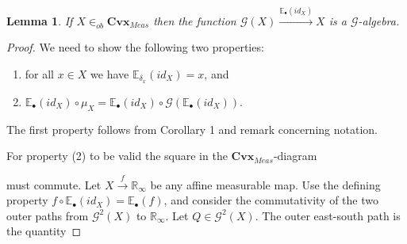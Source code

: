 \documentclass[11pt]{amsart}    %
\newtheorem{lemma}{Lemma}
\newcommand{\Rinf}{\mathbb{R}_{\infty}}
\newcommand{\G}{\mathcal{G}}
\begin{document}
\begin{lemma}
If $X \in_{ob} \mathbf{Cvx}_{Meas}$ then the function $\G(X) \xrightarrow{\mathbb{E}_{\bullet}(id_X)} X$ is a $\G$-algebra.
\end{lemma}
\begin{proof} 
We need to show the following two properties: 
\begin{enumerate}
\item  for all $x \in X$ we have $\mathbb{E}_{\delta_x}(id_X) = x$, and 
\item $ \mathbb{E}_{\bullet}(id_X) \circ \mu_X = \mathbb{E}_{\bullet}(id_X) \circ \G(\mathbb{E}_{\bullet}(id_X))$.
\end{enumerate}
The first property follows from  Corollary 1 and remark concerning notation.  

 For property (2) to be valid the square in the $\mathbf{Cvx}_{Meas}$-diagram
\begin{center}
\end{center}
must commute.  Let $X \xrightarrow{f} \Rinf$ be any affine measurable map.  Use the defining property  $f \circ \mathbb{E}_{\bullet}(id_X) = \mathbb{E}_{\bullet}(f)$, and consider the commutativity of the two outer paths from $\G^2(X)$ to $\Rinf$.  Let $Q \in \G^2(X)$.   The outer east-south path is the quantity


\end{proof}
\end{document}
